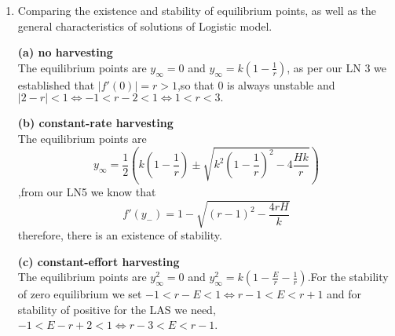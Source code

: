 \documentclass[12pt]{article}
\begin{document}
\begin{enumerate}
(c) To study the stability of nonnegative equilibria analytically we find the derivative of $f$ ,substitute $y_\infty^1\hspace{0.1cm} \mbox{and}\hspace{0.1cm} y_\infty^2$ to obtain
\[f'(y)=r-y-2y-E\Rightarrow f'(y_\infty^1=0)=\boxed{r-E}.\]
For the stability of zero equilibrium: We set\\
\[-1<r-E<1\Leftrightarrow r-1<E<r+1\] 


For the stability of positive equilibrium: we have
\[f'(y_\infty^2)=r-\frac{2r}{k}(k(1-\frac{E}{r}-\frac{1}{r})-E=r-2r+2E+2-E=\boxed{E-r+2}.\]
For the equilibrium to be LAS, we need
\[-1<E-r+2<1\Leftrightarrow -3<E-r-1\Leftrightarrow r-3<E<r-1.\]


\cleardoublepage

\item Comparing the existence and stability of equilibrium points, as well as the general characteristics of solutions of Logistic model.

\textbf {(a) no harvesting}\\
The equilibrium points are $y_\infty=0$ and $y_\infty=k(1-\frac{1}{r})$, as per our LN 3 we established that $\left|f'(0)\right|=r>1$,so that 0  is always unstable and $\left|2-r\right|<1\Leftrightarrow -1<r-2<1\Leftrightarrow 1<r<3.$



\textbf {(b) constant-rate harvesting}\\
The equilibrium points are 
 \[y_\infty=\frac{1}{2}(k(1-\frac{1}{r})\pm \sqrt {k^2(1-\frac{1}{r})^2 -4\frac{Hk}{r}})\],from our LN5 we know that \[f'(y_-)=1-\sqrt{(r-1)^2-\frac{4rH}{k}}\] therefore, there is an existence of stability.
 

\textbf {(c) constant-effort harvesting}\\
The equilibrium points are $y_\infty^2=0$ and $y_\infty^2=k(1-\frac{E}{r}-\frac{1}{r})$.For the stability of zero equilibrium we set $-1<r-E<1\Leftrightarrow r-1<E<r+1$ and for stability of positive for the LAS we need, $-1<E-r+2<1\Leftrightarrow r-3<E<r-1$. \\


\end{enumerate}
\end{document}
